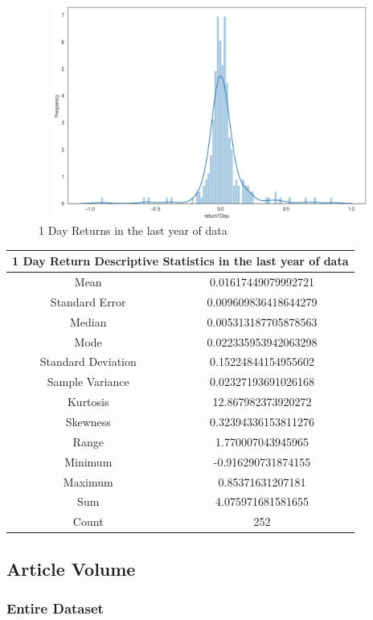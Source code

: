 \begin{figure}[h!]
    \centering
    \includegraphics[width=15cm,height=7cm,keepaspectratio]{resultsEvaluation/1returnDesc1.png}
    \caption{1 Day Returns in the last year of data}
    \label{fig:appendix_1returnDesc1}
\end{figure}
\begin{center}
\begin{tabular}{ c c }
\hline
\multicolumn{2}{|c|}{1 Day Return Descriptive Statistics in the last year of data} \\
\hline
Mean & 0.01617449079992721 \\
Standard Error & 0.009609836418644279 \\
Median & 0.005313187705878563 \\
Mode & 0.022335953942063298 \\
Standard Deviation & 0.15224844154955602 \\
Sample Variance & 0.02327193691026168 \\
Kurtosis & 12.867982373920272 \\
Skewness & 0.32394336153811276 \\
Range & 1.770007043945965 \\
Minimum & -0.916290731874155 \\
Maximum & 0.85371631207181 \\
Sum & 4.075971681581655 \\
Count & 252
\end{tabular}
\end{center}

\subsection{Article Volume}

\subsubsection{Entire Dataset}

